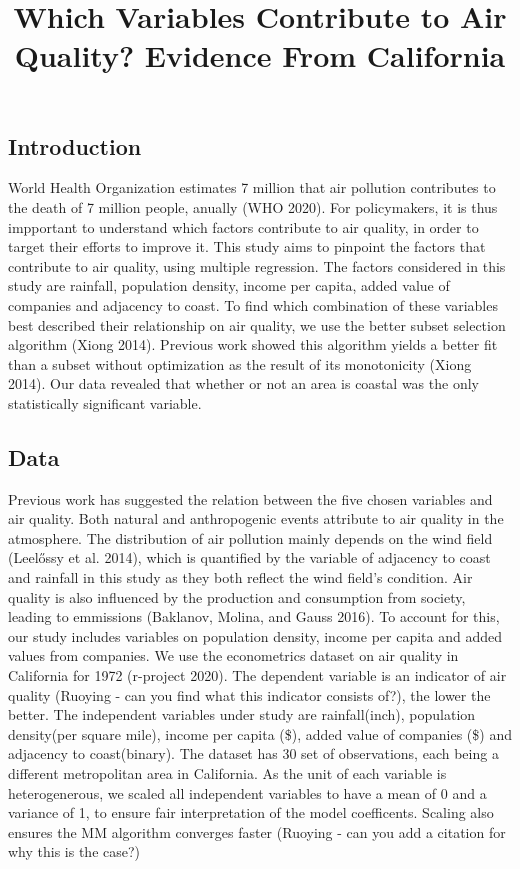 \documentclass[
]{article}
\title{Which Variables Contribute to Air Quality? Evidence From California}
\author{}
\date{\vspace{-2.5em}}
\begin{document}
\maketitle

\hypertarget{introduction}{%
\subsection{Introduction}\label{introduction}}

World Health Organization estimates 7 million that air pollution
contributes to the death of 7 million people, anually (WHO 2020). For
policymakers, it is thus impportant to understand which factors
contribute to air quality, in order to target their efforts to improve
it. This study aims to pinpoint the factors that contribute to air
quality, using multiple regression. The factors considered in this study
are rainfall, population density, income per capita, added value of
companies and adjacency to coast. To find which combination of these
variables best described their relationship on air quality, we use the
better subset selection algorithm (Xiong 2014). Previous work showed
this algorithm yields a better fit than a subset without optimization as
the result of its monotonicity (Xiong 2014). Our data revealed that
whether or not an area is coastal was the only statistically significant
variable.

\hypertarget{Data}{%
\subsection{Data}\label{Data}}

Previous work has suggested the relation between the five chosen
variables and air quality. Both natural and anthropogenic events
attribute to air quality in the atmosphere. The distribution of air
pollution mainly depends on the wind field (Leelőssy et al. 2014), which
is quantified by the variable of adjacency to coast and rainfall in this
study as they both reflect the wind field's condition. Air quality is
also influenced by the production and consumption from society, leading
to emmissions (Baklanov, Molina, and Gauss 2016). To account for this,
our study includes variables on population density, income per capita
and added values from companies. We use the econometrics dataset on air
quality in California for 1972 (r-project 2020). The dependent variable
is an indicator of air quality (Ruoying - can you find what this
indicator consists of?), the lower the better. The independent variables
under study are rainfall(inch), population density(per square mile),
income per capita (\$), added value of companies (\$) and adjacency to
coast(binary). The dataset has 30 set of observations, each being a
different metropolitan area in California. As the unit of each variable
is heterogenerous, we scaled all independent variables to have a mean of
0 and a variance of 1, to ensure fair interpretation of the model
coefficents. Scaling also ensures the MM algorithm converges faster
(Ruoying - can you add a citation for why this is the case?)
\end{document}
